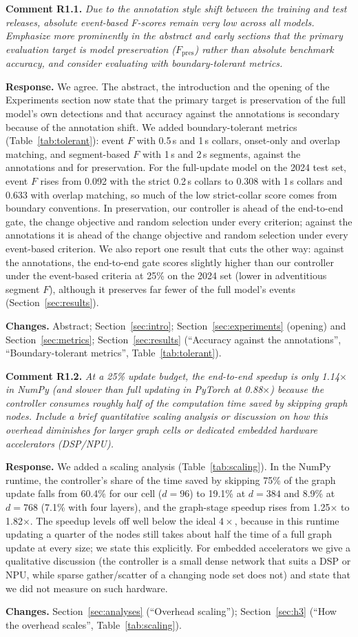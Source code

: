 \documentclass[11pt]{article}
\newcommand{\rc}[2]{\par\medskip\noindent\colorbox{black!6}{\parbox{\dimexpr\linewidth-2\fboxsep}{\textbf{Comment #1.} \itshape #2}}\par}
\newcommand{\resp}{\par\noindent\textbf{Response.} }
\newcommand{\chg}{\par\noindent\textbf{Changes.} }
\begin{document}
\rc{R1.1}{Due to the annotation style shift between the training and test releases, absolute event-based F-scores remain very low across all models. Emphasize more prominently in the abstract and early sections that the primary evaluation target is model preservation ($F_{\mathrm{pres}}$) rather than absolute benchmark accuracy, and consider evaluating with boundary-tolerant metrics.}
\resp We agree. The abstract, the introduction and the opening of the Experiments section now state that the primary target is preservation of the full model's own detections and that accuracy against the annotations is secondary because of the annotation shift. We added boundary-tolerant metrics (Table~\ref{tab:tolerant}): event $F$ with 0.5\,s and 1\,s collars, onset-only and overlap matching, and segment-based $F$ with 1\,s and 2\,s segments, against the annotations and for preservation. For the full-update model on the 2024 test set, event $F$ rises from 0.092 with the strict 0.2\,s collars to 0.308 with 1\,s collars and 0.633 with overlap matching, so much of the low strict-collar score comes from boundary conventions. In preservation, our controller is ahead of the end-to-end gate, the change objective and random selection under every criterion; against the annotations it is ahead of the change objective and random selection under every event-based criterion. We also report one result that cuts the other way: against the annotations, the end-to-end gate scores slightly higher than our controller under the event-based criteria at 25\% on the 2024 set (lower in adventitious segment $F$), although it preserves far fewer of the full model's events (Section~\ref{sec:results}).
\chg Abstract; Section~\ref{sec:intro}; Section~\ref{sec:experiments} (opening) and Section~\ref{sec:metrics}; Section~\ref{sec:results} (``Accuracy against the annotations'', ``Boundary-tolerant metrics'', Table~\ref{tab:tolerant}).

\rc{R1.2}{At a 25\% update budget, the end-to-end speedup is only 1.14$\times$ in NumPy (and slower than full updating in PyTorch at 0.88$\times$) because the controller consumes roughly half of the computation time saved by skipping graph nodes. Include a brief quantitative scaling analysis or discussion on how this overhead diminishes for larger graph cells or dedicated embedded hardware accelerators (DSP/NPU).}
\resp We added a scaling analysis (Table~\ref{tab:scaling}). In the NumPy runtime, the controller's share of the time saved by skipping 75\% of the graph update falls from 60.4\% for our cell ($d{=}96$) to 19.1\% at $d{=}384$ and 8.9\% at $d{=}768$ (7.1\% with four layers), and the graph-stage speedup rises from 1.25$\times$ to 1.82$\times$. The speedup levels off well below the ideal $4\times$, because in this runtime updating a quarter of the nodes still takes about half the time of a full graph update at every size; we state this explicitly. For embedded accelerators we give a qualitative discussion (the controller is a small dense network that suits a DSP or NPU, while sparse gather/scatter of a changing node set does not) and state that we did not measure on such hardware.
\chg Section~\ref{sec:analyses} (``Overhead scaling''); Section~\ref{sec:h3} (``How the overhead scales'', Table~\ref{tab:scaling}).
\end{document}
